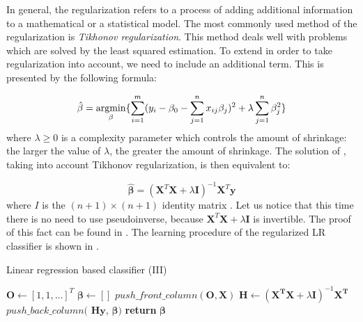 In general, the regularization refers to a process of adding additional information to a mathematical or a statistical model. The most commonly used method of the regularization is \textit{Tikhonov regularization}. This method deals well with problems which are solved by the least squared estimation. To extend  in order to take regularization into account, we need to include an additional term. This is presented by the following formula:

\begin{equation}\label{eq:LR6}
    \hat{\beta} = \operatorname*{argmin}_{\beta}\{\sum\limits_{i=1}^{m}(y_{i}-\beta_0 - \sum\limits_{j=1}^{n}x_{ij}\beta_j)^2+\lambda\sum\limits_{j=1}^{n}\beta_{j}^2\}
\end{equation}
where $\lambda \geq 0$ is a complexity parameter which controls the amount of shrinkage: the larger the value of $\lambda$, the greater the amount of shrinkage.  The solution of , taking into account Tikhonov regularization, is then equivalent to:

\begin{equation}\label{eq:LR7}
    \boldsymbol{\hat{\beta}} = (\boldsymbol{X}^T\boldsymbol{X}+\lambda\boldsymbol{I})^{-1}\boldsymbol{X}^T\boldsymbol{y}
\end{equation}
where $I$ is the $(n+1)\times(n+1)$ identity matrix \citep{Trevor}.
Let us notice that this time there is no need to use pseudoinverse, because $\boldsymbol{X}^T\boldsymbol{X}+\lambda\boldsymbol{I}$ is invertible. The proof of this fact can be found in . The learning procedure of the regularized LR classifier is shown in .

\begin{algorithm}
    \caption{Linear regression based classifier (III)}\label{alg:LR2}
    \begin{algorithmic}[1]
        \State $\boldsymbol{O} \gets [1, 1, \ldots]^T$ 
        \State $\boldsymbol{\beta} \gets []$
        \State $push\_front\_column(\boldsymbol{O}, \boldsymbol{X})$
        \State $\boldsymbol{H} \gets (\boldsymbol{X^T}\boldsymbol{X}+\lambda\boldsymbol{I})^{-1}\boldsymbol{X^T}$
            \State $push\_back\_column($ $\boldsymbol{H}\boldsymbol{y}$, $\boldsymbol{\beta})$ 
        \EndFor
        \State \textbf{return} $\boldsymbol{\beta}$
    \EndFunction
    \end{algorithmic}
\end{algorithm}


